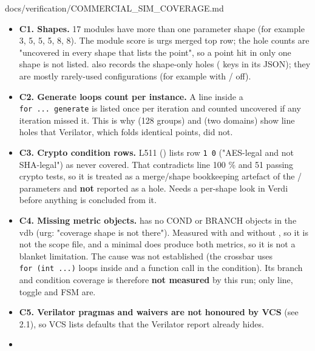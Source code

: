 \begin{relocated}{docs/verification/COMMERCIAL_SIM_COVERAGE.md}
\begin{itemize}
\tightlist
\item
  \textbf{C1. Shapes.} 17 modules have more than one parameter shape
  (for example  3,  5,
   5,  5,  8,
   8). The module score is urg\textquotesingle s
  merged top row; the hole counts are "uncovered in every shape that
  lists the point", so a point hit in only one shape is not listed.
   also records the shape-only holes
  ( keys in its JSON); they are mostly rarely-used
  configurations (for example  with
  / off).
\item
  \textbf{C2. Generate loops count per instance.} A line inside a
  \texttt{for\ .\allowbreak{}.\allowbreak{}.\allowbreak{}\ generate} is
  listed once per iteration and counted uncovered if any iteration
  missed it. This is why  (128 groups) and
   (two domains) show line holes that Verilator, which folds
  identical points, did not.
\item
  \textbf{C3. Crypto condition rows.}  L511
  () lists row \texttt{1\ 0} ("AES-legal and not
  SHA-legal") as never covered. That contradicts  line
  100 \% and 51 passing crypto tests, so it is treated as a
  merge/\allowbreak{}shape bookkeeping artefact of the
  / parameters and \textbf{not} reported as a
  hole. Needs a per-shape look in Verdi before anything is concluded
  from it.
\item
  \textbf{C4. Missing metric objects.}  has no COND
  or BRANCH objects in the vdb (urg: "coverage shape is not there").
  Measured with and without , so it is not the scope
  file, and a minimal   does produce
  both metrics, so it is not a blanket  limitation.
  The cause was not established (the crossbar uses
  \texttt{for\ (int\ .\allowbreak{}.\allowbreak{}.\allowbreak{})} loops
  inside  and a function call in the condition). Its
  branch and condition coverage is therefore \textbf{not measured} by
  this run; only line, toggle and FSM are.
\item
  \textbf{C5. Verilator pragmas and waivers are not honoured by VCS}
  (see 2.1), so VCS lists defaults that the Verilator report already
  hides.
\item

\end{itemize}
\end{relocated}

